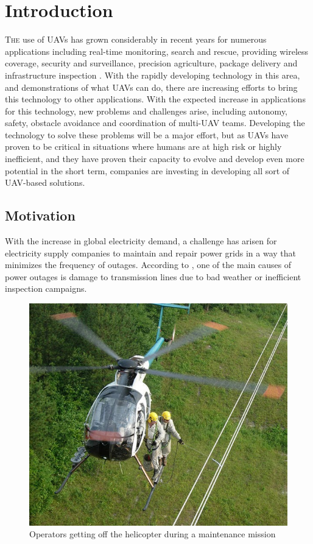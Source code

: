 \chapter{Introduction}
\label{ch:Introduction}
\lettrine[lraise=-0.1, lines=2, loversize=0.2]{T}{he} use of \glspl{UAV} has grown considerably in recent years for numerous applications including real-time monitoring, search and rescue, providing wireless coverage, security and surveillance, precision agriculture, package delivery and infrastructure inspection \cite{CivilAplications}. With the rapidly developing technology in this area, and demonstrations of what \glspl{UAV} can do, there are increasing efforts to bring this technology to other applications. With the expected increase in applications for this technology, new problems and challenges arise, including autonomy, safety, obstacle avoidance and coordination of multi-\gls{UAV} teams. Developing the technology to solve these problems will be a major effort, but as \glspl{UAV} have proven to be critical in situations where humans are at high risk or highly inefficient, and they have proven their capacity to evolve and develop even more potential in the short term, companies are investing in developing all sort of \gls{UAV}-based solutions.

\section{Motivation}
\label{sec:Motivation}
With the increase in global electricity demand, a challenge has arisen for electricity supply companies to maintain and repair power grids in a way that minimizes the frequency of outages. According to \cite{PowerOutagesCauses}, one of the main causes of power outages is damage to transmission lines due to bad weather or inefficient inspection campaigns.

\begin{figure}[htbp]
    \centering
    \includegraphics[width=0.6\linewidth]
    {Introduction/figures/helicopter.jpg}
    \caption{Operators getting off the helicopter during a maintenance mission}
    \label{fig:helicopter}
\end{figure}

